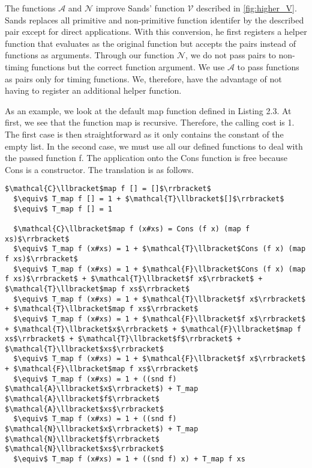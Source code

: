 The functions $\mathcal{A}$ and $\mathcal{N}$ improve Sands' function $\mathcal{V}$ described in \autoref{fig:higher_V}.
Sands replaces all primitive and non-primitive function identifer by the described pair except for direct applications.
With this conversion, he first registers a helper function that evaluates as the original function but accepts the pairs instead of functions as arguments.
Through our function $\mathcal{N}$, we do not pass pairs to non-timing functions but the correct function argument.
We use $\mathcal{A}$ to pass functions as pairs only for timing functions.
We, therefore, have the advantage of not having to register an additional helper function.

As an example, we look at the default map function defined in Listing 2.3. At first, we see that the function map is recursive.
Therefore, the calling cost is 1.
The first case is then straightforward as it only contains the constant of the empty list.
In the second case, we must use all our defined functions to deal with the passed function f.
The application onto the Cons function is free because Cons is a constructor.
The translation is as follows.
\begin{lstlisting}[mathescape=true,language=translation]
  $\mathcal{C}\llbracket$map f [] = []$\rrbracket$
  $\equiv$ T_map f [] = 1 + $\mathcal{T}\llbracket$[]$\rrbracket$
  $\equiv$ T_map f [] = 1

  $\mathcal{C}\llbracket$map f (x#xs) = Cons (f x) (map f xs)$\rrbracket$
  $\equiv$ T_map f (x#xs) = 1 + $\mathcal{T}\llbracket$Cons (f x) (map f xs)$\rrbracket$
  $\equiv$ T_map f (x#xs) = 1 + $\mathcal{F}\llbracket$Cons (f x) (map f xs)$\rrbracket$ + $\mathcal{T}\llbracket$f x$\rrbracket$ + $\mathcal{T}\llbracket$map f xs$\rrbracket$
  $\equiv$ T_map f (x#xs) = 1 + $\mathcal{T}\llbracket$f x$\rrbracket$ + $\mathcal{T}\llbracket$map f xs$\rrbracket$
  $\equiv$ T_map f (x#xs) = 1 + $\mathcal{F}\llbracket$f x$\rrbracket$ + $\mathcal{T}\llbracket$x$\rrbracket$ + $\mathcal{F}\llbracket$map f xs$\rrbracket$ + $\mathcal{T}\llbracket$f$\rrbracket$ + $\mathcal{T}\llbracket$xs$\rrbracket$
  $\equiv$ T_map f (x#xs) = 1 + $\mathcal{F}\llbracket$f x$\rrbracket$ + $\mathcal{F}\llbracket$map f xs$\rrbracket$
  $\equiv$ T_map f (x#xs) = 1 + ((snd f) $\mathcal{A}\llbracket$x$\rrbracket$) + T_map $\mathcal{A}\llbracket$f$\rrbracket$ $\mathcal{A}\llbracket$xs$\rrbracket$
  $\equiv$ T_map f (x#xs) = 1 + ((snd f) $\mathcal{N}\llbracket$x$\rrbracket$) + T_map $\mathcal{N}\llbracket$f$\rrbracket$ $\mathcal{N}\llbracket$xs$\rrbracket$
  $\equiv$ T_map f (x#xs) = 1 + ((snd f) x) + T_map f xs
\end{lstlisting}

